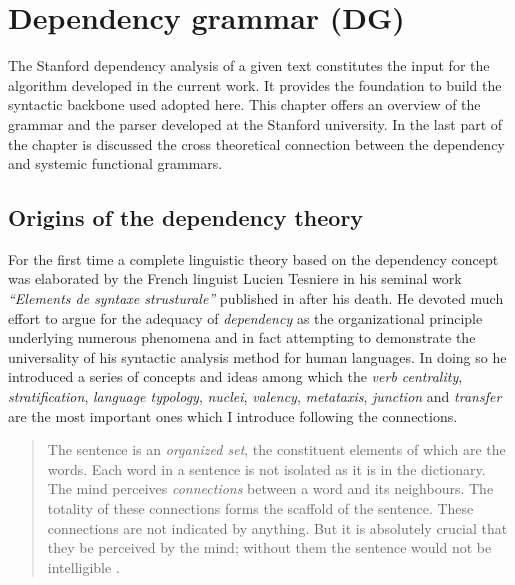 \chapter{Dependency grammar (DG)}
\label{ch:dependecy-grammar}

The Stanford dependency analysis of a given text constitutes the input for the algorithm developed in the current work. It provides the foundation to build the syntactic backbone used adopted here. This chapter offers an overview of the grammar and the parser developed at the Stanford university. In the last part of the chapter is discussed the cross theoretical connection between the dependency and systemic functional grammars. 

\section{Origins of the dependency theory}
\label{sec:origins}
For the first time a complete linguistic theory based on the dependency concept was elaborated by the French linguist Lucien Tesniere in his seminal work \textit{``Elements de syntaxe strusturale''} published in \citeyear{Tesniere59} after his death. He devoted much effort to argue for the adequacy of \textit{dependency} as the organizational principle underlying numerous phenomena and in fact attempting to demonstrate the universality of his syntactic analysis method for human languages. In doing so he introduced a series of concepts and ideas among which the \textit{verb centrality}, \textit{stratification}, \textit{language typology}, \textit{nuclei}, \textit{valency}, \textit{metataxis}, \textit{junction} and \textit{transfer} are the most important ones which I introduce following the connections.


\begin{quotation}
    The sentence is an \textit{organized set}, the constituent elements of which are the words. Each word in a sentence is not isolated as it is in the dictionary. The mind perceives \textit{connections} between a word and its neighbours. The totality of these connections forms the scaffold of the sentence. These connections are not indicated by anything. But it is absolutely crucial that they be perceived by the mind; without them the sentence would not be intelligible \citep[3]{Tesniere2015}.
\end{quotation}

